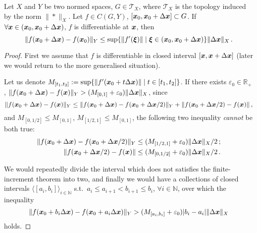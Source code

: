 \documentclass[openany]{book}
\begin{document}
\begin{theorem}
	\label{theorem: finite-increment theorem}
	Let $X$ and $Y$ be two normed spaces, $G \in \mathscr T_X$, where $\mathscr T_X$ is the topology induced by the norm $\|*\|_X$. 
	Let $f \in C(G, Y)$, $[\boldsymbol{x}_0, \boldsymbol{x}_0 + \Delta \boldsymbol{x}] \subset G$.
	If $\forall \boldsymbol{x} \in (\boldsymbol{x}_0, \boldsymbol{x}_0 + \Delta \boldsymbol{x})$, $f$ is differentiable at $\boldsymbol{x}$, then
	\begin{equation*}
		\|f(\boldsymbol{x}_0 + \Delta \boldsymbol{x}) - f(\boldsymbol{x}_0)\|_Y 
			\leq \sup \{\|f'(\boldsymbol{\xi})\|  \mid \boldsymbol{\xi} \in (\boldsymbol{x}_0, \boldsymbol{x}_0 + \Delta \boldsymbol{x})\} \|\Delta \boldsymbol{x}\|_X\,.
	\end{equation*}
\end{theorem}
\begin{proof}
	First we assume that $f$ is differentiable in closed interval $[\boldsymbol{x}, \boldsymbol{x} + \Delta \boldsymbol{x}]$ (later we would return to the more generalised situation).

	Let us denote $M_{[t_1, t_2]} := \sup \{\|f'(\boldsymbol{x}_0 + t\Delta \boldsymbol{x})\|  \mid t \in [t_1, t_2] \}$. 
	If there exists $\varepsilon_0 \in \mathbb R_+$, $\|f(\boldsymbol{x}_0 + \Delta \boldsymbol{x}) - f(\boldsymbol{x})\|_Y > (M_{[0, 1]} + \varepsilon_0) \|\Delta \boldsymbol{x}\|_X$, since 
	\begin{equation*}
		\|f(\boldsymbol{x}_0 + \Delta \boldsymbol{x}) - f(\boldsymbol{x})\|_Y \leq
		\|f(\boldsymbol{x}_0 + \Delta \boldsymbol{x}) - f(\boldsymbol{x}_0 + \Delta \boldsymbol{x} / 2)\|_Y
			+ \|f(\boldsymbol{x}_0 + \Delta \boldsymbol{x} / 2) - f(\boldsymbol{x})\|\,,
	\end{equation*}
	and $M_{[0, 1/2]} \leq M_{[0, 1]}$, $M_{[1/2, 1]} \leq M_{[0, 1]}$, the following two inequality \emph{cannot} be both true: 
	\begin{align*}
		\|f(\boldsymbol{x}_0 + \Delta \boldsymbol{x}) - f(\boldsymbol{x}_0 + \Delta \boldsymbol{x} / 2)\|_Y 
			&\leq (M_{[1/2, 1]} + \varepsilon_0) \|\Delta \boldsymbol{x}\|_X/2\,;
		\\
		\|f(\boldsymbol{x}_0 + \Delta \boldsymbol{x} / 2) - f(\boldsymbol{x})\| 
			&\leq (M_{[0, 1/2]} + \varepsilon_0) \|\Delta \boldsymbol{x}\|_X / 2 \,.
	\end{align*} 
	
	We would repeatedly divide the interval which does not satisfies the finite-increment theorem into two, and finally we would have a collections of closed intervals $\langle[a_i, b_i]\rangle_{i \in \mathbb N}$ s.t.\ $a_i \leq a_{i + 1} < b_{i +1} \leq b_i$, $\forall i \in \mathbb N$, over which the inequality
	\begin{equation*}
		\|f(\boldsymbol{x}_0 + b_i \Delta \boldsymbol{x}) - f(\boldsymbol{x}_0 + a_i \Delta \boldsymbol{x})\|_Y
			> (M_{[a_i, b_i]} + \varepsilon_0) |b_i - a_i| \|\Delta \boldsymbol{x}\|_X
	\end{equation*}
	holds.


\end{proof}
\end{document}
